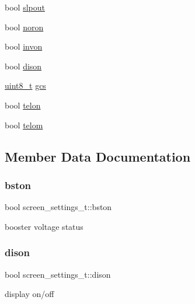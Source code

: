 \begin{DoxyCompactItemize}
\item 
bool \hyperlink{structscreen__settings__t_a840cbd1ac22e878d2828d8780daccc2c}{slpout}
\item 
bool \hyperlink{structscreen__settings__t_aaf1cf50e0a9396996091156f0b7a3bd3}{noron}
\item 
bool \hyperlink{structscreen__settings__t_a9d13034a607f38a182223f8fcc6dada1}{invon}
\item 
bool \hyperlink{structscreen__settings__t_a8fd1aa43e1400e9376ba9f1e66994a5c}{dison}
\item 
\hyperlink{vl53l0x__types_8h_aba7bc1797add20fe3efdf37ced1182c5}{uint8\+\_\+t} \hyperlink{structscreen__settings__t_a696f0baa16234456867bacc806b59537}{gcs}
\item 
bool \hyperlink{structscreen__settings__t_a4c6ed6c63c228d7f9e68a9627d43b259}{telon}
\item 
bool \hyperlink{structscreen__settings__t_ace00804e6bf6c200c79a0746ba6e462f}{telom}
\end{DoxyCompactItemize}


\subsection{Member Data Documentation}
\mbox{\label{structscreen__settings__t_aac406fcdf039a835479da26647ecf6bd}} 
\subsubsection{\texorpdfstring{bston}{bston}}
{\footnotesize\ttfamily bool screen\+\_\+settings\+\_\+t\+::bston}

booster voltage status \mbox{\label{structscreen__settings__t_a8fd1aa43e1400e9376ba9f1e66994a5c}} 
\subsubsection{\texorpdfstring{dison}{dison}}
{\footnotesize\ttfamily bool screen\+\_\+settings\+\_\+t\+::dison}

display on/off \mbox{\label{structscreen__settings__t_a0b6a0e2a0df6813023c86e9354a4f185}} 
